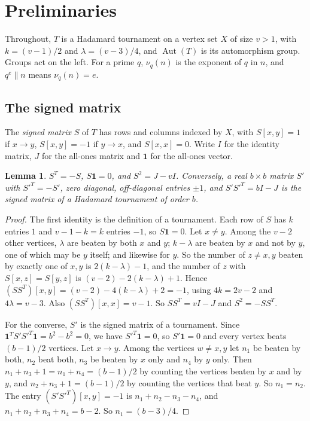 \documentclass[11pt]{amsart}
\newtheorem{lemma}[theorem]{Lemma}
\theoremstyle{definition}
\theoremstyle{remark}
\newcommand{\one}{\mathbf{1}}
\newcommand{\Aut}{\operatorname{Aut}}
\begin{document}
\section{Preliminaries}\label{sec:prelim}

Throughout, $T$ is a Hadamard tournament on a vertex set $X$ of size $v>1$, with $k=(v-1)/2$ and $\lambda=(v-3)/4$, and $\Aut(T)$ is its automorphism group. Groups act on the left. For a prime $q$, $\nu_q(n)$ is the exponent of $q$ in $n$, and $q^e\parallel n$ means $\nu_q(n)=e$.

\subsection{The signed matrix}
The \emph{signed matrix} $S$ of $T$ has rows and columns indexed by $X$, with $S[x,y]=1$ if $x\to y$, $S[x,y]=-1$ if $y\to x$, and $S[x,x]=0$. Write $I$ for the identity matrix, $J$ for the all-ones matrix and $\one$ for the all-ones vector.

\begin{lemma}\label{lem:S}
$S^{T}=-S$, $S\one=0$, and $S^2=J-vI$. Conversely, a real $b\times b$ matrix $S'$ with $S'^{T}=-S'$, zero diagonal, off-diagonal entries $\pm1$, and $S'S'^{T}=bI-J$ is the signed matrix of a Hadamard tournament of order $b$.
\end{lemma}
\begin{proof}
The first identity is the definition of a tournament. Each row of $S$ has $k$ entries $1$ and $v-1-k=k$ entries $-1$, so $S\one=0$. Let $x\ne y$. Among the $v-2$ other vertices, $\lambda$ are beaten by both $x$ and $y$; $k-\lambda$ are beaten by $x$ and not by $y$, one of which may be $y$ itself; and likewise for $y$. So the number of $z\ne x,y$ beaten by exactly one of $x,y$ is $2(k-\lambda)-1$, and the number of $z$ with $S[x,z]=S[y,z]$ is $(v-2)-2(k-\lambda)+1$. Hence $(SS^{T})[x,y]=(v-2)-4(k-\lambda)+2=-1$, using $4k=2v-2$ and $4\lambda=v-3$. Also $(SS^{T})[x,x]=v-1$. So $SS^{T}=vI-J$ and $S^2=-SS^{T}$.

For the converse, $S'$ is the signed matrix of a tournament. Since $\one^{T}S'S'^{T}\one=b^2-b^2=0$, we have $S'^{T}\one=0$, so $S'\one=0$ and every vertex beats $(b-1)/2$ vertices. Let $x\to y$. Among the vertices $w\ne x,y$ let $n_1$ be beaten by both, $n_2$ beat both, $n_3$ be beaten by $x$ only and $n_4$ by $y$ only. Then $n_1+n_3+1=n_1+n_4=(b-1)/2$ by counting the vertices beaten by $x$ and by $y$, and $n_2+n_3+1=(b-1)/2$ by counting the vertices that beat $y$. So $n_1=n_2$. The entry $(S'S'^{T})[x,y]=-1$ is $n_1+n_2-n_3-n_4$, and $n_1+n_2+n_3+n_4=b-2$. So $n_1=(b-3)/4$.
\end{proof}
\end{document}
